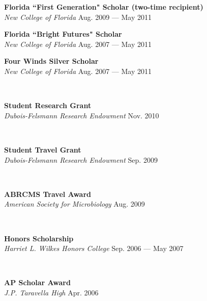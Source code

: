 \documentclass[a4paper,12pt]{article}
\newcommand{\ressubheading}[4]{{\begin{minipage}{\textwidth}
                                    \textbf{#1} \hfill #2 \\
                                    \textit{#3} \hfill #4 \\
\end{minipage}}}
\begin{document}
    \ressubheading{Florida ``First Generation" Scholar {\normalfont(two-time recipient)}}{}{New College of Florida}{Aug. 2009 --- May 2011}

    \ressubheading{Florida ``Bright Futures" Scholar}{}{New College of Florida}{Aug. 2007 --- May 2011}

    \ressubheading{Four Winds Silver Scholar}{}{New College of Florida}{Aug. 2007 --- May 2011}\


    \ressubheading{Student Research Grant}{}{Dubois-Felsmann Research Endowment}{Nov. 2010}\

    \ressubheading{Student Travel Grant}{}{Dubois-Felsmann Research Endowment}{Sep. 2009}\

    \ressubheading{ABRCMS Travel Award}{}{American Society for Microbiology}{Aug. 2009}\

    \ressubheading{Honors Scholarship}{}{Harriet L. Wilkes Honors College}{Sep. 2006 --- May 2007}\

    \ressubheading{AP Scholar Award}{}{J.P. Taravella High}{Apr. 2006}
\end{document}
